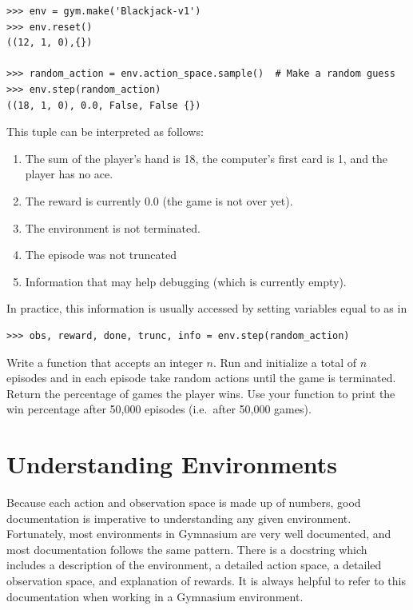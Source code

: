 \begin{lstlisting}
>>> env = gym.make('Blackjack-v1')
>>> env.reset()
((12, 1, 0),{})

>>> random_action = env.action_space.sample()  # Make a random guess
>>> env.step(random_action)
((18, 1, 0), 0.0, False, False {})
\end{lstlisting}
This tuple can be interpreted as follows:
\begin{enumerate}
\item The sum of the player's hand is 18, the computer's first card is 1, and the player has no ace.
\item The reward is currently 0.0 (the game is not over yet).
\item The environment is not terminated.
\item The episode was not truncated
\item Information that may help debugging (which is currently empty).
\end{enumerate}
In practice, this information is usually accessed by setting variables equal to  as in
\begin{lstlisting}
>>> obs, reward, done, trunc, info = env.step(random_action)
\end{lstlisting}

\begin{problem}
Write a function  that accepts an integer $n$.
Run and initialize  a total of $n$ episodes and in each episode take random actions until the game is terminated.
Return the percentage of games the player wins.
Use your function to print the win percentage after 50,000 episodes (i.e.\ after 50,000 games).
\label{prob:random-blackjack}
\end{problem}

\section*{Understanding Environments}
Because each action and observation space is made up of numbers, good documentation is imperative to understanding any given environment.
Fortunately, most environments in Gymnasium are very well documented, and most documentation follows the same pattern.
There is a docstring which includes a description of the environment, a detailed action space, a detailed observation space, and explanation of rewards.
It is always helpful to refer to this documentation when working in a Gymnasium environment.

